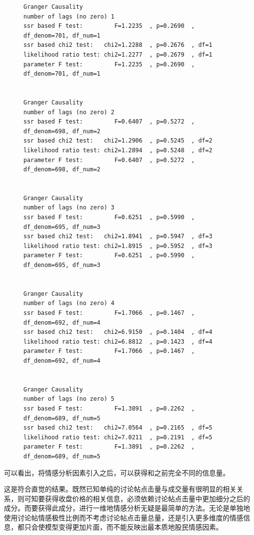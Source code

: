 \begin{figure}
  \begin{minipage}{\textwidth}
    \begin{lstlisting}[caption=浦发银行 (600000) 价格与积极讨论帖点击量检验结果, label=price_click_count:9]
Granger Causality
number of lags (no zero) 1
ssr based F test:         F=1.2235  , p=0.2690  , df_denom=701, df_num=1
ssr based chi2 test:   chi2=1.2288  , p=0.2676  , df=1
likelihood ratio test: chi2=1.2277  , p=0.2679  , df=1
parameter F test:         F=1.2235  , p=0.2690  , df_denom=701, df_num=1


Granger Causality
number of lags (no zero) 2
ssr based F test:         F=0.6407  , p=0.5272  , df_denom=698, df_num=2
ssr based chi2 test:   chi2=1.2906  , p=0.5245  , df=2
likelihood ratio test: chi2=1.2894  , p=0.5248  , df=2
parameter F test:         F=0.6407  , p=0.5272  , df_denom=698, df_num=2


Granger Causality
number of lags (no zero) 3
ssr based F test:         F=0.6251  , p=0.5990  , df_denom=695, df_num=3
ssr based chi2 test:   chi2=1.8941  , p=0.5947  , df=3
likelihood ratio test: chi2=1.8915  , p=0.5952  , df=3
parameter F test:         F=0.6251  , p=0.5990  , df_denom=695, df_num=3


Granger Causality
number of lags (no zero) 4
ssr based F test:         F=1.7066  , p=0.1467  , df_denom=692, df_num=4
ssr based chi2 test:   chi2=6.9150  , p=0.1404  , df=4
likelihood ratio test: chi2=6.8812  , p=0.1423  , df=4
parameter F test:         F=1.7066  , p=0.1467  , df_denom=692, df_num=4


Granger Causality
number of lags (no zero) 5
ssr based F test:         F=1.3891  , p=0.2262  , df_denom=689, df_num=5
ssr based chi2 test:   chi2=7.0564  , p=0.2165  , df=5
likelihood ratio test: chi2=7.0211  , p=0.2191  , df=5
parameter F test:         F=1.3891  , p=0.2262  , df_denom=689, df_num=5
    \end{lstlisting}
  \end{minipage}
\end{figure}

可以看出，将情感分析因素引入之后，可以获得和之前完全不同的信息量。

这是符合直觉的结果。既然已知单纯的讨论帖点击量与成交量有很明显的相关关系，则可知要获得收盘价格的相关信息，必须依赖讨论帖点击量中更加细分之后的成分。而要获得此成分，进行一维地情感分析无疑是最简单的方法。无论是单独地使用讨论帖情感极性比例而不考虑讨论帖点击量总量，还是引入更多维度的情感信息，都只会使模型变得更加片面，而不能反映出最本质地股民情感因素。

